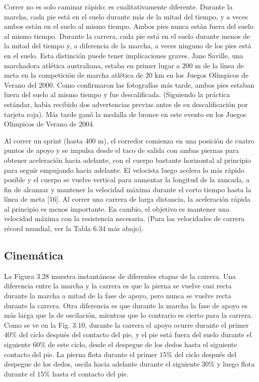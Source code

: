 \documentclass[12pt]{book}
\begin{document}
Correr no es solo caminar rápido; es cualitativamente diferente. Durante la marcha, cada pie está en el suelo durante más de la mitad del tiempo, y a veces ambos están en el suelo al mismo tiempo. Ambos pies nunca están fuera del suelo al mismo tiempo. Durante la carrera, cada pie está en el suelo durante menos de la mitad del tiempo y, a diferencia de la marcha, a veces ninguno de los pies está en el suelo. Esta distinción puede tener implicaciones graves. Jane Saville, una marchadora atlética australiana, estaba en primer lugar a $200\text{ m}$ de la línea de meta en la competición de marcha atlética de $20\text{ km}$ en los Juegos Olímpicos de Verano del 2000. Como confirmaron las fotografías más tarde, ambos pies estaban fuera del suelo al mismo tiempo y fue descalificada. (Siguiendo la práctica estándar, había recibido dos advertencias previas antes de su descalificación por tarjeta roja). Más tarde ganó la medalla de bronce en este evento en los Juegos Olímpicos de Verano de 2004.

Al correr un sprint (hasta $400\text{ m}$), el corredor comienza en una posición de cuatro puntos de apoyo y se impulsa desde el taco de salida con ambas piernas para obtener aceleración hacia adelante, con el cuerpo bastante horizontal al principio para seguir empujando hacia adelante. El velocista luego acelera lo más rápido posible y el cuerpo se vuelve vertical para aumentar la longitud de la zancada, a fin de alcanzar y mantener la velocidad máxima durante el corto tiempo hasta la línea de meta [16]. Al correr una carrera de larga distancia, la aceleración rápida al principio es menos importante. En cambio, el objetivo es mantener una velocidad máxima con la resistencia necesaria. (Para las velocidades de carrera récord mundial, ver la Tabla 6.34 más abajo).

\subsection{Cinemática}

La Figura 3.28 muestra instantáneas de diferentes etapas de la carrera. Una diferencia entre la marcha y la carrera es que la pierna se vuelve casi recta durante la marcha a mitad de la fase de apoyo, pero nunca se vuelve recta durante la carrera. Otra diferencia es que durante la marcha la fase de apoyo es más larga que la de oscilación, mientras que lo contrario es cierto para la carrera. Como se ve en la Fig. 3.10, durante la carrera el apoyo ocurre durante el primer $40\%$ del ciclo después del contacto del pie, y el pie está fuera del suelo durante el siguiente $60\%$ de este ciclo, desde el despegue de los dedos hasta el siguiente contacto del pie. La pierna flota durante el primer $15\%$ del ciclo después del despegue de los dedos, oscila hacia adelante durante el siguiente $30\%$ y luego flota durante el $15\%$ hasta el contacto del pie.
\end{document}
